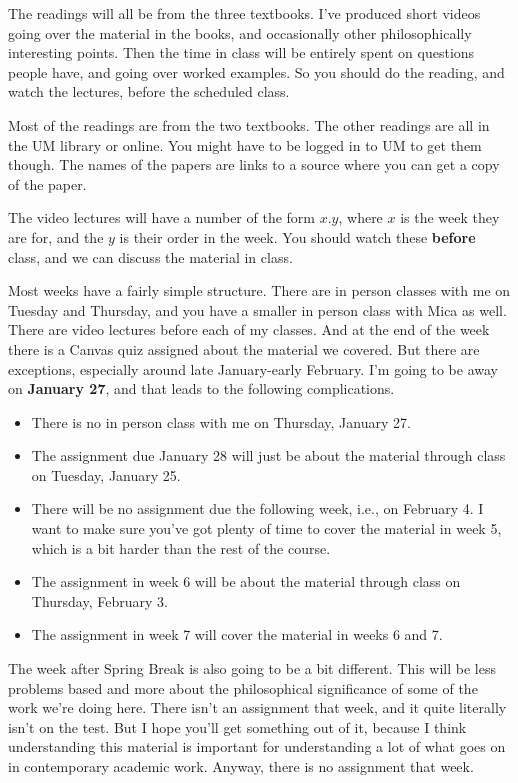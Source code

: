 \documentclass[
]{article}
\providecommand{\tightlist}{%
  \setlength{\itemsep}{0pt}\setlength{\parskip}{0pt}}
\begin{document}
The readings will all be from the three textbooks. I've produced short
videos going over the material in the books, and occasionally other
philosophically interesting points. Then the time in class will be
entirely spent on questions people have, and going over worked examples.
So you should do the reading, and watch the lectures, before the
scheduled class.

Most of the readings are from the two textbooks. The other readings are
all in the UM library or online. You might have to be logged in to UM to
get them though. The names of the papers are links to a source where you
can get a copy of the paper.

The video lectures will have a number of the form \(x.y\), where \(x\)
is the week they are for, and the \(y\) is their order in the week. You
should watch these \textbf{before} class, and we can discuss the
material in class.

Most weeks have a fairly simple structure. There are in person classes
with me on Tuesday and Thursday, and you have a smaller in person class
with Mica as well. There are video lectures before each of my classes.
And at the end of the week there is a Canvas quiz assigned about the
material we covered. But there are exceptions, especially around late
January-early February. I'm going to be away on \textbf{January 27}, and
that leads to the following complications.

\begin{itemize}
\tightlist
\item
  There is no in person class with me on Thursday, January 27.
\item
  The assignment due January 28 will just be about the material through
  class on Tuesday, January 25.
\item
  There will be no assignment due the following week, i.e., on February
  4. I want to make sure you've got plenty of time to cover the material
  in week 5, which is a bit harder than the rest of the course.
\item
  The assignment in week 6 will be about the material through class on
  Thursday, February 3.
\item
  The assignment in week 7 will cover the material in weeks 6 and 7.
\end{itemize}

The week after Spring Break is also going to be a bit different. This
will be less problems based and more about the philosophical
significance of some of the work we're doing here. There isn't an
assignment that week, and it quite literally isn't on the test. But I
hope you'll get something out of it, because I think understanding this
material is important for understanding a lot of what goes on in
contemporary academic work. Anyway, there is no assignment that week.
\end{document}
